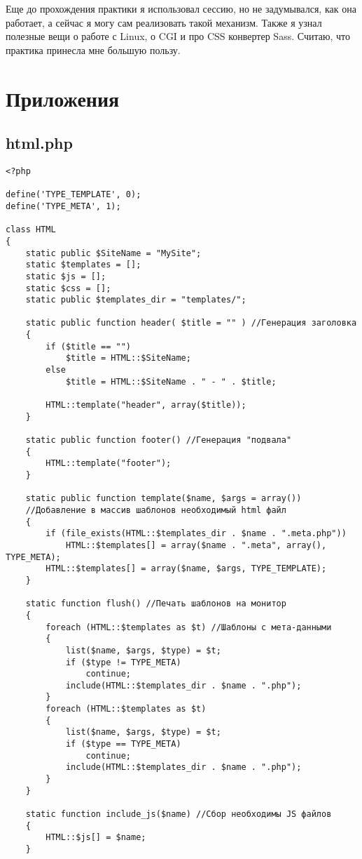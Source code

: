 \documentclass[a4paper]{article}
\begin{document}
Еще до прохождения практики я использовал сессию, но не задумывался, как она работает, а сейчас я могу сам реализовать такой механизм. Также я узнал полезные вещи о работе с Linux, о CGI и про CSS конвертер Sass. Считаю, что практика принесла мне большую пользу.

\section{Приложения}
\subsection{html.php}
\begin{verbatim}
<?php

define('TYPE_TEMPLATE', 0);
define('TYPE_META', 1);

class HTML
{
    static public $SiteName = "MySite";
    static $templates = [];
    static $js = [];
    static $css = [];
    static public $templates_dir = "templates/";

    static public function header( $title = "" ) //Генерация заголовка
    {
        if ($title == "")
            $title = HTML::$SiteName;
        else
            $title = HTML::$SiteName . " - " . $title;

        HTML::template("header", array($title));
    }

    static public function footer() //Генерация "подвала"
    {
        HTML::template("footer");
    }

    static public function template($name, $args = array())
    //Добавление в массив шаблонов необходимый html файл
    {
        if (file_exists(HTML::$templates_dir . $name . ".meta.php"))
            HTML::$templates[] = array($name . ".meta", array(), TYPE_META);
        HTML::$templates[] = array($name, $args, TYPE_TEMPLATE);
    }

    static function flush() //Печать шаблонов на монитор
    {
        foreach (HTML::$templates as $t) //Шаблоны с мета-данными
        {
            list($name, $args, $type) = $t;
            if ($type != TYPE_META)
                continue;
            include(HTML::$templates_dir . $name . ".php");
        }
        foreach (HTML::$templates as $t)
        {
            list($name, $args, $type) = $t;
            if ($type == TYPE_META)
                continue;
            include(HTML::$templates_dir . $name . ".php");
        }
    }

    static function include_js($name) //Сбор необходимы JS файлов
    {
        HTML::$js[] = $name;
    }


\end{verbatim}
\end{document}
